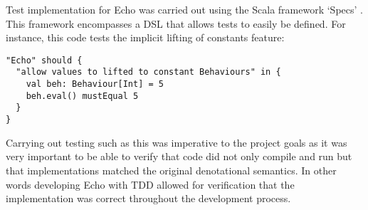     Test implementation for Echo was carried out using the Scala framework `Specs' \cite{EricTorreborre}. This framework
    encompasses a DSL that allows tests to easily be defined. For instance, this code tests the implicit lifting
    of constants feature:

\begin{verbatim}
"Echo" should {
  "allow values to lifted to constant Behaviours" in {
    val beh: Behaviour[Int] = 5
    beh.eval() mustEqual 5
  }
}
\end{verbatim}

    Carrying out testing such as this was imperative to the project goals as it was very important to be able
    to verify that code did not only compile and run but that implementations matched the original denotational 
    semantics. In other words developing Echo with TDD allowed for verification that the implementation
    was correct throughout the development process.
